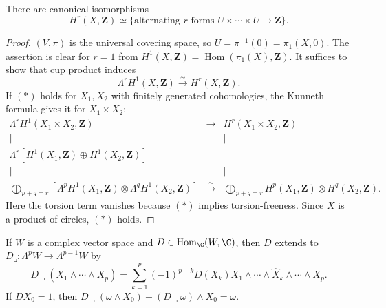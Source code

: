 \begin{theorem}
\label{mumford-frag-integral-cohomology}
There are canonical isomorphisms
\[
 H^r(X,\mathbf Z)\simeq
 \{\text{alternating $r$-forms }U\times\cdots\times U\to\mathbf Z\}.
\]
\end{theorem}
\begin{proof}
$(V,\pi)$ is the universal covering space, so $U=\pi^{-1}(0)=\pi_1(X,0)$.
The assertion is clear for $r=1$ from
$H^1(X,\mathbf Z)=\operatorname{Hom}(\pi_1(X),\mathbf Z)$.  It suffices to
show that cup product induces
\[
 \Lambda^rH^1(X,\mathbf Z)\xrightarrow{\sim}H^r(X,\mathbf Z).
 \tag{*}
\]
If $(*)$ holds for $X_1,X_2$ with finitely generated cohomologies, the
Kunneth formula gives it for $X_1\times X_2$:
\[
\begin{array}{ccc}
\Lambda^rH^1(X_1\times X_2,\mathbf Z)&\longrightarrow&H^r(X_1\times X_2,\mathbf Z)\\
\Vert&&\Vert\\
\Lambda^r[H^1(X_1,\mathbf Z)\oplus H^1(X_2,\mathbf Z)]&&\\
\Vert&&\Vert\\
\displaystyle\bigoplus_{p+q=r}[\Lambda^pH^1(X_1,\mathbf Z)\otimes\Lambda^qH^1(X_2,\mathbf Z)]&\xrightarrow{\sim}&
\displaystyle\bigoplus_{p+q=r}H^p(X_1,\mathbf Z)\otimes H^q(X_2,\mathbf Z).
\end{array}
\]
Here the torsion term vanishes because $(*)$ implies torsion-freeness.  Since
$X$ is a product of circles, $(*)$ holds.
\end{proof}

\begin{lemma}
\label{mumford-frag-interior}
If $W$ is a complex vector space and $D\in\operatorname{Hom}_{\C}(W,\C)$,
then $D$ extends to $D\mathbin{\lrcorner}:\Lambda^pW\to\Lambda^{p-1}W$ by
\[
 D\mathbin{\lrcorner}(X_1\wedge\cdots\wedge X_p)=
 \sum_{k=1}^p(-1)^{p-k}D(X_k)X_1\wedge\cdots\wedge\widehat X_k\wedge\cdots\wedge X_p.
\]
If $DX_0=1$, then
$D\mathbin{\lrcorner}(\omega\wedge X_0)+(D\mathbin{\lrcorner}\omega)\wedge X_0=\omega$.
\end{lemma}

